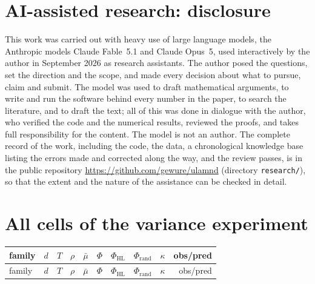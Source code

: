 \documentclass[11pt,a4paper]{article}
\theoremstyle{remark}\newtheorem{remark}[theorem]{Remark}
\begin{document}
\section*{AI-assisted research: disclosure}
This work was carried out with heavy use of large language models, the Anthropic models Claude Fable~5.1 and
Claude Opus~5, used interactively by the author in September 2026 as research assistants. The author posed the questions, set the
direction and the scope, and made every decision about what to pursue, claim and submit. The model was used to draft
mathematical arguments, to write and run the software behind every number in the paper, to search the literature,
and to draft the text; all of this was done in dialogue with the author, who verified the code and the numerical
results, reviewed the proofs, and takes full responsibility for the content. The model is not an author. The
complete record of the work, including the code, the data, a chronological knowledge base listing the errors made
and corrected along the way, and the review passes, is in the public repository
\url{https://github.com/gewure/ulamnd} (directory \texttt{research/}), so that the extent and the nature of the
assistance can be checked in detail.




\appendix
\section{All cells of the variance experiment}\label{app:cells}

\begin{center}\footnotesize
\begin{longtable}{llrrrrrrrr}
\toprule
family & $d$ & $T$ & $\rho$ & $\bar\mu$ & $\Phi$ & $\Phi_{\mathrm{HL}}$ & $\Phi_{\mathrm{rand}}$ & $\kappa$ & obs/pred\\
\midrule
\endfirsthead
\toprule
family & $d$ & $T$ & $\rho$ & $\bar\mu$ & $\Phi$ & $\Phi_{\mathrm{HL}}$ & $\Phi_{\mathrm{rand}}$ & $\kappa$ & obs/pred\\
\midrule
\endhead

\end{longtable}
\end{center}
\end{document}
